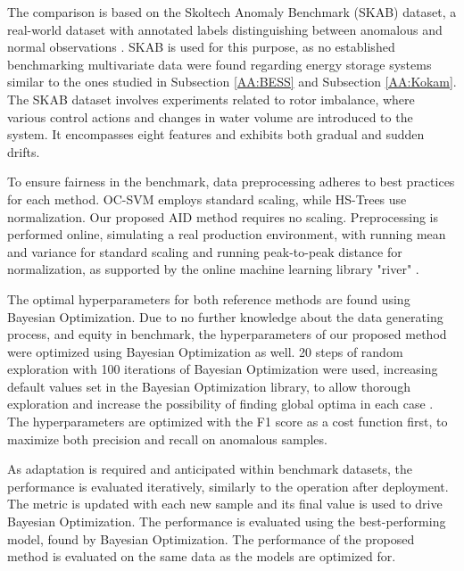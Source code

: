 The comparison is based on the Skoltech Anomaly Benchmark (SKAB) dataset, a real-world dataset with annotated labels distinguishing between anomalous and normal observations \citep{skab2020}. SKAB is used for this purpose, as no established benchmarking multivariate data were found regarding energy storage systems similar to the ones studied in Subsection \ref{AA:BESS} and Subsection \ref{AA:Kokam}. The SKAB dataset involves experiments related to rotor imbalance, where various control actions and changes in water volume are introduced to the system. It encompasses eight features and exhibits both gradual and sudden drifts.

To ensure fairness in the benchmark, data preprocessing adheres to best practices for each method. OC-SVM employs standard scaling, while HS-Trees use normalization. Our proposed AID method requires no scaling. Preprocessing is performed online, simulating a real production environment, with running mean and variance for standard scaling and running peak-to-peak distance for normalization, as supported by the online machine learning library "river" \citep{Montiel2021}.

The optimal hyperparameters for both reference methods are found using Bayesian Optimization. Due to no further knowledge about the data generating process, and equity in benchmark, the hyperparameters of our proposed method were optimized using Bayesian Optimization as well. 20 steps of random exploration with 100 iterations of Bayesian Optimization were used, increasing default values set in the Bayesian Optimization library, to allow thorough exploration and increase the possibility of finding global optima in each case \citep{Nogueira2014}. The hyperparameters are optimized with the F1 score as a cost function first, to maximize both precision and recall on anomalous samples. %

As adaptation is required and anticipated within benchmark datasets, the performance is evaluated iteratively, similarly to the operation after deployment. The metric is updated with each new sample and its final value is used to drive Bayesian Optimization. The performance is evaluated using the best-performing model, found by Bayesian Optimization. The performance of the proposed method is evaluated on the same data as the models are optimized for.

